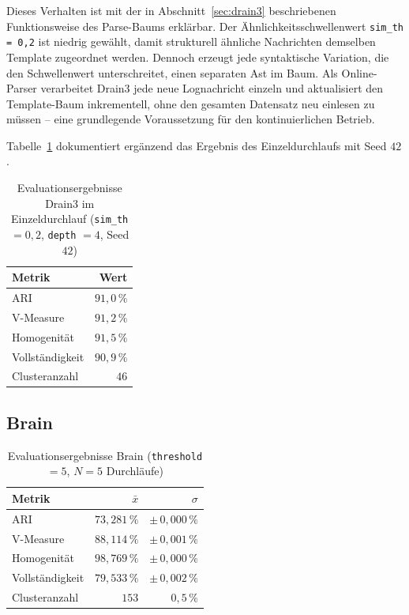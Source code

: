 Dieses Verhalten ist mit der in Abschnitt~\ref{sec:drain3} beschriebenen Funktionsweise des
Parse-Baums erklärbar. Der Ähnlichkeitsschwellenwert \texttt{sim\_th = 0{,}2} ist niedrig
gewählt, damit strukturell ähnliche Nachrichten demselben Template zugeordnet werden. Dennoch
erzeugt jede syntaktische Variation, die den Schwellenwert unterschreitet, einen separaten
Ast im Baum. Als Online-Parser verarbeitet Drain3 jede neue Lognachricht einzeln und
aktualisiert den Template-Baum inkrementell, ohne den gesamten Datensatz neu einlesen zu
müssen – eine grundlegende Voraussetzung für den kontinuierlichen Betrieb.

Tabelle~\ref{tab:eval:drain3:single} dokumentiert ergänzend das Ergebnis des
Einzeldurchlaufs mit Seed $42$.

\begin{table}[h]
    \centering
    \caption{Evaluationsergebnisse Drain3 im Einzeldurchlauf (\texttt{sim\_th} $= 0{,}2$, \texttt{depth} $= 4$, Seed $42$)}
    \label{tab:eval:drain3:single}
    \begin{tabular}{lr}
        \toprule
        Metrik & Wert \\
        \midrule
        ARI             & $91{,}0\,\%$ \\
        V-Measure       & $91{,}2\,\%$ \\
        Homogenität     & $91{,}5\,\%$ \\
        Vollständigkeit & $90{,}9\,\%$ \\
        \midrule
        Clusteranzahl   & $46$ \\
        \bottomrule
    \end{tabular}
\end{table}

\subsection{Brain}
\label{sec:eval:brain}

\begin{table}[h]
    \centering
    \caption{Evaluationsergebnisse Brain (\texttt{threshold} $= 5$, $N = 5$ Durchläufe)}
    \label{tab:eval:brain}
    \begin{tabular}{lrr}
        \toprule
        Metrik & $\bar{x}$ & $\sigma$ \\
        \midrule
        ARI            & $73{,}281\,\%$ & $\pm\,0{,}000\,\%$ \\
        V-Measure      & $88{,}114\,\%$ & $\pm\,0{,}001\,\%$ \\
        Homogenität    & $98{,}769\,\%$ & $\pm\,0{,}000\,\%$ \\
        Vollständigkeit& $79{,}533\,\%$ & $\pm\,0{,}002\,\%$ \\
        \midrule
        Clusteranzahl  & $153$ & $0{,}5\,\%$ \\
        \bottomrule
    \end{tabular}
\end{table}

